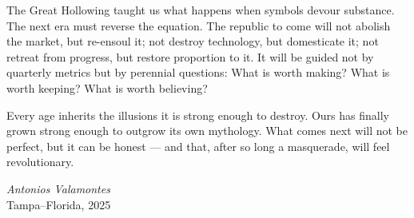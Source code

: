\documentclass[11pt,twoside]{book}
\begin{document}
The Great Hollowing taught us what happens when symbols devour substance.  
The next era must reverse the equation.  The republic to come will not abolish the market, but re-ensoul it; not destroy technology, but domesticate it; not retreat from progress, but restore proportion to it.  It will be guided not by quarterly metrics but by perennial questions: What is worth making? What is worth keeping? What is worth believing?

Every age inherits the illusions it is strong enough to destroy.  Ours has finally grown strong enough to outgrow its own mythology.  What comes next will not be perfect, but it can be honest — and that, after so long a masquerade, will feel revolutionary.

\vspace{2em}
\begin{flushright}
\textit{Antonios Valamontes}\\
Tampa–Florida, 2025
\end{flushright}

%
%

\end{document}
